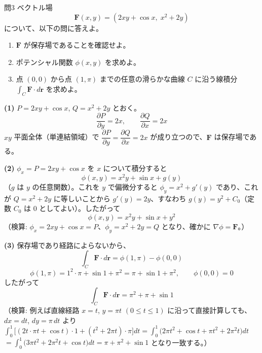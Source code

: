 \documentclass[a4paper,11pt]{article}
\begin{document}
\clearpage
\begin{mondaiboxS}{問3}
ベクトル場
\[
\bm{F}(x,y) = \left(2xy + \cos x,\; x^{2} + 2y\right)
\]
について、以下の問に答えよ。
\begin{enumerate}
\item $\bm{F}$ が保存場であることを確認せよ。
\item ポテンシャル関数 $\phi(x,y)$ を求めよ。
\item 点 $(0,0)$ から点 $(1,\pi)$ までの任意の滑らかな曲線 $C$ に沿う線積分 $\displaystyle\int_{C} \bm{F}\cdot d\bm{r}$ を求めよ。
\end{enumerate}
\end{mondaiboxS}
\kaitou
\textbf{(1)} $P = 2xy + \cos x$, $Q = x^{2} + 2y$ とおく。
\[
\frac{\partial P}{\partial y} = 2x, \qquad \frac{\partial Q}{\partial x} = 2x
\]
$xy$ 平面全体（単連結領域）で $\dfrac{\partial P}{\partial y} = \dfrac{\partial Q}{\partial x} = 2x$ が成り立つので、$\bm{F}$ は保存場である。

\textbf{(2)} $\phi_x = P = 2xy + \cos x$ を $x$ について積分すると
\[
\phi(x,y) = x^{2}y + \sin x + g(y)
\]
（$g$ は $y$ の任意関数）。これを $y$ で偏微分すると $\phi_y = x^{2} + g'(y)$ であり、これが $Q = x^{2} + 2y$ に等しいことから $g'(y) = 2y$、すなわち $g(y) = y^{2} + C_0$（定数 $C_0$ は $0$ としてよい）。したがって
\[
\boxed{\; \phi(x,y) = x^{2}y + \sin x + y^{2} \;}
\]
（検算: $\phi_x = 2xy + \cos x = P$、$\phi_y = x^{2} + 2y = Q$ となり、確かに $\nabla\phi = \bm{F}$。）

\textbf{(3)} 保存場であり経路によらないから、
\[
\int_{C} \bm{F}\cdot d\bm{r} = \phi(1,\pi) - \phi(0,0)
\]
\[
\phi(1,\pi) = 1^{2}\cdot \pi + \sin 1 + \pi^{2} = \pi + \sin 1 + \pi^{2}, \qquad \phi(0,0) = 0
\]
したがって
\[
\boxed{\; \int_{C} \bm{F}\cdot d\bm{r} = \pi^{2} + \pi + \sin 1 \;}
\]
（検算: 例えば直線経路 $x=t$, $y=\pi t$ $(0\le t\le 1)$ に沿って直接計算しても、$dx=dt$, $dy=\pi\,dt$ より
$\int_0^1 \bigl[(2t\cdot\pi t+\cos t)\cdot 1 + (t^2+2\pi t)\cdot \pi\bigr]dt = \int_0^1 \bigl(2\pi t^2+\cos t+\pi t^2+2\pi^2 t\bigr)dt$
$=\int_0^1\bigl(3\pi t^2 + 2\pi^2 t+\cos t\bigr)dt = \pi + \pi^2 + \sin 1$ となり一致する。）
\end{document}
